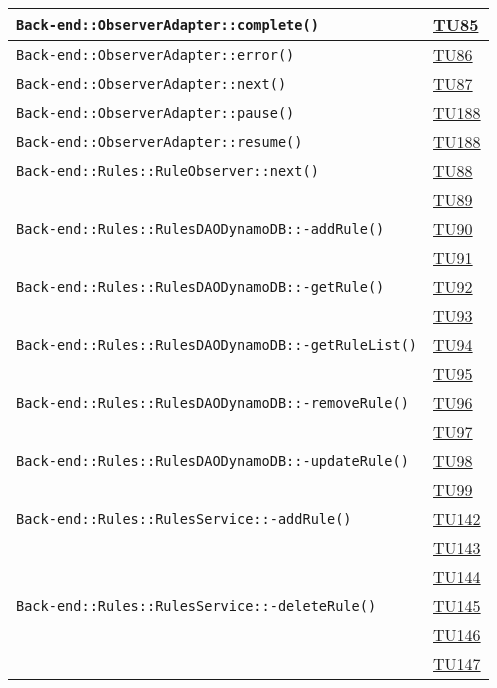 \begin{longtable}{|>{\centering}m{12cm}|m{1cm}<{\centering}|}
\texttt{Back-end::ObserverAdapter::complete()} & \hyperlink{TU85}{TU85}\\ \hline
\texttt{Back-end::ObserverAdapter::error()} & \hyperlink{TU86}{TU86}\\ \hline
\texttt{Back-end::ObserverAdapter::next()} & \hyperlink{TU87}{TU87}\\ \hline
\texttt{Back-end::ObserverAdapter::pause()} & \hyperlink{TU188}{TU188}\\ \hline
\texttt{Back-end::ObserverAdapter::resume()} & \hyperlink{TU188}{TU188}\\ \hline
\texttt{Back-end::Rules::RuleObserver::next()} & \hyperlink{TU88}{TU88}\\ & \hyperlink{TU89}{TU89}\\ \hline
\texttt{Back-end::Rules::RulesDAODynamoDB::-\linebreak addRule()} & \hyperlink{TU90}{TU90}\\ & \hyperlink{TU91}{TU91}\\ \hline
\texttt{Back-end::Rules::RulesDAODynamoDB::-\linebreak getRule()} & \hyperlink{TU92}{TU92}\\ & \hyperlink{TU93}{TU93}\\ \hline
\texttt{Back-end::Rules::RulesDAODynamoDB::-\linebreak getRuleList()} & \hyperlink{TU94}{TU94}\\ & \hyperlink{TU95}{TU95}\\ \hline
\texttt{Back-end::Rules::RulesDAODynamoDB::-\linebreak removeRule()} & \hyperlink{TU96}{TU96}\\ & \hyperlink{TU97}{TU97}\\ \hline
\texttt{Back-end::Rules::RulesDAODynamoDB::-\linebreak updateRule()} & \hyperlink{TU98}{TU98}\\ & \hyperlink{TU99}{TU99}\\ \hline
\texttt{Back-end::Rules::RulesService::-\linebreak addRule()} & \hyperlink{TU142}{TU142}\\ & \hyperlink{TU143}{TU143}\\ & \hyperlink{TU144}{TU144}\\ \hline
\texttt{Back-end::Rules::RulesService::-\linebreak deleteRule()} & \hyperlink{TU145}{TU145}\\ & \hyperlink{TU146}{TU146}\\ & \hyperlink{TU147}{TU147}\\ \hline

\end{longtable}
